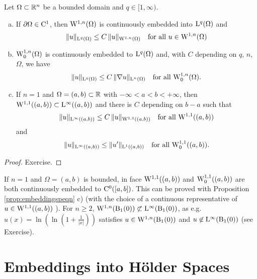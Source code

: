 \begin{prop}
  \label{prop:embeddingspeqn}
  Let $\Omega \subset \mathbb{R}^n$ be a bounded domain and $q \in [1,\infty)$.
    \begin{enumerate}[a)]
      \item If $\partial\Omega \in \mathrm{C}^1$, then $\mathrm{W}^{1,n}(\Omega)$ is continuously embedded into $\mathrm{L}^q(\Omega)$ and 
        $$
        \|u\|_{\mathrm{L}^q(\Omega)} \leq C \, \|u\|_{\mathrm{W}^{1,n}(\Omega)} \quad\text{for all } u \in \mathrm{W}^{1,n}(\Omega)
        $$

      \item $\mathrm{W}_0^{1,n}(\Omega)$ is continuously embedded to $\mathrm{L}^q(\Omega)$ and, with $C$ depending on $q$, $n$, $\Omega$, we have
        $$
        \| u\|_{\mathrm{L}^q(\Omega)} \leq C \, \|\nabla u\|_{\mathrm{L}^n(\Omega)} \quad\text{for all } \mathrm{W}_0^{1,n}(\Omega).
        $$

      \item If $n = 1$ and $\Omega = (a,b) \subset \mathbb{R}$ with $-\infty < a < b < + \infty$, then $\mathrm{W}^{1,1}((a,b)) \subset \mathrm{L}^\infty((a,b))$ and there is $C$ depending on $b - a$ such that
        $$
        \|u\|_{\mathrm{L}^\infty((a,b))} \leq C \, \|u\|_{\mathrm{W}^{1,1}((a,b))} \quad\text{for all } \mathrm{W}^{1,1}((a,b))
        $$
        and
        $$
        \|u\|_{\mathrm{L}^\infty((a,b))} \leq \|u'\|_{\mathrm{L}^1((a,b))} \quad\text{for all } \mathrm{W}_0^{1,1}((a,b)).
        $$
    \end{enumerate}
\end{prop}

\begin{proof}
  Exercise.
\end{proof}

\begin{rem}
  If $n = 1$ and $\Omega = (a,b)$ is bounded, in face $\mathrm{W}^{1,1}((a,b))$ and $\mathrm{W}_0^{1,1}((a,b))$ are both continuously embedded to $\mathrm{C}^0([a,b])$.
  This can be proved with Proposition \ref{prop:embeddingspeqn} c) (with the choice of a continuous representative of $u \in \mathrm{W}^{1,1}((a,b))$ ).
  For $n \geq 2$, $\mathrm{W}^{1,n}(\mathrm{B}_1(0)) \not\subset \mathrm{L}^\infty(\mathrm{B}_1(0))$, as e.g. $u(x) = \ln(\ln(1 + \frac{1}{|x|}))$ satisfies $u \in \mathrm{W}^{1,n}(\mathrm{B}_1(0))$ and $u \not\in \mathrm{L}^\infty(\mathrm{B}_1(0))$ (see Exercise).
\end{rem}

\section{Embeddings into Hölder Spaces}

